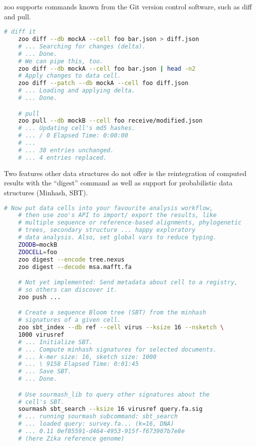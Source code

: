 zoo supports commands known from the Git version control software, such as diff and pull.


\begin{minipage}{\linewidth}
\begin{lstlisting}[language=bash]
    # diff it
    zoo diff --db mockA --cell foo bar.json > diff.json
    # ... Searching for changes (delta).
    # ... Done.
    # We can pipe this, too.
    zoo diff --db mockA --cell foo bar.json | head -n2
    # Apply changes to data cell.
    zoo diff --patch --db mockA --cell foo diff.json
    # ... Loading and applying delta.
    # ... Done.

    # pull
    zoo pull --db mockB --cell foo receive/modified.json
    # ... Updating cell's md5 hashes.
    # ... / 0 Elapsed Time: 0:00:00
    # ...
    # ... 38 entries unchanged.
    # ... 4 entries replaced.

\end{lstlisting}
\end{minipage}


Two features other data structures do not offer is the reintegration of computed results with the ``digest'' command as well as support for probabilistic data structures (Minhash, SBT).


\begin{minipage}{\linewidth}
\begin{lstlisting}[language=bash]
    # Now put data cells into your favourite analysis workflow,
    # then use zoo's API to import/ export the results, like
    # multiple sequence or reference-based alignments, phylogenetic
    # trees, secondary structure ... happy exploratory
    # data analysis. Also, set global vars to reduce typing.
    ZOODB=mockB
    ZOOCELL=foo
    zoo digest --encode tree.nexus
    zoo digest --decode msa.mafft.fa

    # Not yet implemented: Send metadata about cell to a registry,
    # so others can discover it.
    zoo push ...

    # Create a sequence Bloom tree (SBT) from the minhash
    # signatures of a given cell.
    zoo sbt_index --db ref --cell virus --ksize 16 --nsketch \
    1000 virusref
    # ... Initialize SBT.
    # ... Compute minhash signatures for selected documents.
    # ... k-mer size: 16, sketch size: 1000
    # ... \ 9158 Elapsed Time: 0:01:45
    # ... Save SBT.
    # ... Done.

    # Use sourmash_lib to query other signatures about the
    # cell's SBT.
    sourmash sbt_search --ksize 16 virusref query.fa.sig
    # ... running sourmash subcommand: sbt_search
    # ... loaded query: survey.fa... (k=16, DNA)
    # ... 0.11 0ef85591-d464-4953-915f-f673907b7e8e
    # (here Zika reference genome)
\end{lstlisting}
\end{minipage}


